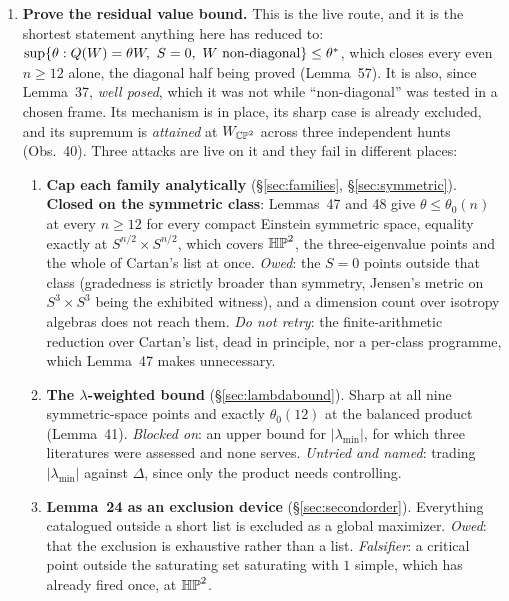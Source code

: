 \begin{enumerate}[leftmargin=1.8em]
\item \textbf{Prove the residual value bound.} This is the live route, and it is the shortest statement anything here has reduced to: $\sup\{\theta:Q(W)=\theta W,\ S=0,\ W\text{ non-diagonal}\}\le\theta^{*}$, which closes every even $n\ge12$ alone, the diagonal half being proved (Lemma~57). It is also, since Lemma~37, \emph{well posed}, which it was not while ``non-diagonal'' was tested in a chosen frame. Its mechanism is in place, its sharp case is already excluded, and its supremum is \emph{attained} at $W_{\mathbb{CP}^2}$ across three independent hunts (Obs.~40). Three attacks are live on it and they fail in different places:

\begin{enumerate}[label=(\alph*),leftmargin=1.8em,nosep]
\item \textbf{Cap each family analytically} (\S\ref{sec:families}, \S\ref{sec:symmetric}). \textbf{Closed on the symmetric class}: Lemmas~47 and 48 give $\theta\le\theta_0(n)$ at every $n\ge12$ for every compact Einstein symmetric space, equality exactly at $S^{n/2}\times S^{n/2}$, which covers $\mathbb{HP}^2$, the three-eigenvalue points and the whole of Cartan's list at once. \emph{Owed}: the $S=0$ points outside that class (gradedness is strictly broader than symmetry, Jensen's metric on $S^3\times S^3$ being the exhibited witness), and a dimension count over isotropy algebras does not reach them. \emph{Do not retry}: the finite-arithmetic reduction over Cartan's list, dead in principle, nor a per-class programme, which Lemma~47 makes unnecessary.
\item \textbf{The $\lambda$-weighted bound} (\S\ref{sec:lambdabound}). Sharp at all nine symmetric-space points and exactly $\theta_0(12)$ at the balanced product (Lemma~41). \emph{Blocked on}: an upper bound for $|\lambda_{\min}|$, for which three literatures were assessed and none serves. \emph{Untried and named}: trading $|\lambda_{\min}|$ against $\Delta$, since only the product needs controlling.
\item \textbf{Lemma~24 as an exclusion device} (\S\ref{sec:secondorder}). Everything catalogued outside a short list is excluded as a global maximizer. \emph{Owed}: that the exclusion is exhaustive rather than a list. \emph{Falsifier}: a critical point outside the saturating set saturating with $1$ simple, which has already fired once, at $\mathbb{HP}^2$.
\end{enumerate}


\end{enumerate}

